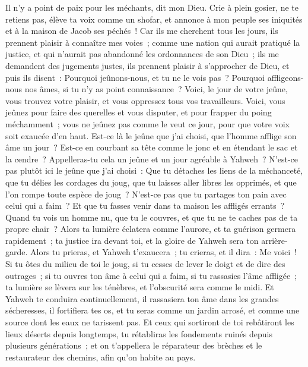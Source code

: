 \begin{multicols}{2}
Il n'y a point de paix pour les méchants, dit mon Dieu.
\VerseOne{}Crie à plein gosier, ne te retiens pas, élève ta voix comme un shofar, et annonce à mon peuple ses iniquités et à la maison de Jacob ses péchés~!
Car ils me cherchent tous les jours, ils prennent plaisir à connaître mes voies~; comme une nation qui aurait pratiqué la justice, et qui n'aurait pas abandonné les ordonnances de son Dieu~; ils me demandent des jugements justes, ils prennent plaisir à s'approcher de Dieu, et puis ils disent~:
Pourquoi jeûnons-nous, et tu ne le vois pas~? Pourquoi affligeons-nous nos âmes, si tu n'y as point connaissance~? Voici, le jour de votre jeûne, vous trouvez votre plaisir, et vous oppressez tous vos travailleurs.
Voici, vous jeûnez pour faire des querelles et vous disputer, et pour frapper du poing méchamment~; vous ne jeûnez pas comme le veut ce jour, pour que votre voix soit exaucée d'en haut.
Est-ce là le jeûne que j'ai choisi, que l'homme afflige son âme un jour~? Est-ce en courbant sa tête comme le jonc et en étendant le sac et la cendre~? Appelleras-tu cela un jeûne et un jour agréable à Yahweh~?
N'est-ce pas plutôt ici le jeûne que j'ai choisi~: Que tu détaches les liens de la méchanceté, que tu délies les cordages du joug, que tu laisses aller libres les opprimés, et que l'on rompe toute espèce de joug~?
N'est-ce pas que tu partages ton pain avec celui qui a faim~? Et que tu fasses venir dans ta maison les affligés errants~? Quand tu vois un homme nu, que tu le couvres, et que tu ne te caches pas de ta propre chair~?
Alors ta lumière éclatera comme l'aurore, et ta guérison germera rapidement~; ta justice ira devant toi, et la gloire de Yahweh sera ton arrière-garde.
Alors tu prieras, et Yahweh t'exaucera~; tu crieras, et il dira~: Me voici~! Si tu ôtes du milieu de toi le joug, si tu cesses de lever le doigt et de dire des outrages~;
si tu ouvres ton âme à celui qui a faim, si tu rassasies l'âme affligée~; ta lumière se lèvera sur les ténèbres, et l'obscurité sera comme le midi.
Et Yahweh te conduira continuellement, il rassasiera ton âme dans les grandes sécheresses, il fortifiera tes os, et tu seras comme un jardin arrosé, et comme une source dont les eaux ne tarissent pas.
Et ceux qui sortiront de toi rebâtiront les lieux déserts depuis longtemps, tu rétabliras les fondements ruinés depuis plusieurs générations~; et on t'appellera le réparateur des brèches et le restaurateur des chemins, afin qu'on habite au pays.

\end{multicols}
